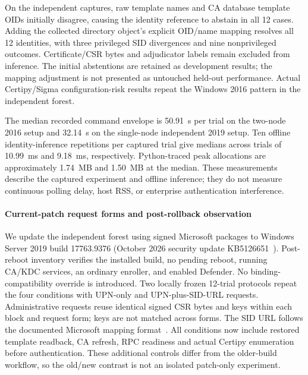 On the independent captures, raw template names and CA database template OIDs initially disagree, causing the identity reference to abstain in all 12 cases. Adding the collected directory object's explicit OID/name mapping resolves all 12 identities, with three privileged SID divergences and nine nonprivileged outcomes. Certificate/CSR bytes and adjudicator labels remain excluded from inference. The initial abstentions are retained as development results; the mapping adjustment is not presented as untouched held-out performance. Actual Certipy/Sigma configuration-risk results repeat the Windows 2016 pattern in the independent forest.

The median recorded command envelope is 50.91~s per trial on the two-node 2016 setup and 32.14~s on the single-node independent 2019 setup. Ten offline identity-inference repetitions per captured trial give medians across trials of 10.99~ms and 9.18~ms, respectively. Python-traced peak allocations are approximately 1.74~MB and 1.50~MB at the median. These measurements describe the captured experiment and offline inference; they do not measure continuous polling delay, host RSS, or enterprise authentication interference.

\paragraph{Current-patch request forms and post-rollback observation}
We update the independent forest using signed Microsoft packages to Windows Server 2019 build 17763.9376 (October 2026 security update KB5126651~\cite{microsoft2026october2019}). Post-reboot inventory verifies the installed build, no pending reboot, running CA/KDC services, an ordinary enroller, and enabled Defender. No binding-compatibility override is introduced. Two locally frozen 12-trial protocols repeat the four conditions with UPN-only and UPN-plus-SID-URL requests. Administrative requests reuse identical signed CSR bytes and keys within each block and request form; keys are not matched across forms. The SID URL follows the documented Microsoft mapping format~\cite{microsoft2025pkcasid}. All conditions now include restored template readback, CA refresh, RPC readiness and actual Certipy enumeration before authentication. These additional controls differ from the older-build workflow, so the old/new contrast is not an isolated patch-only experiment.



